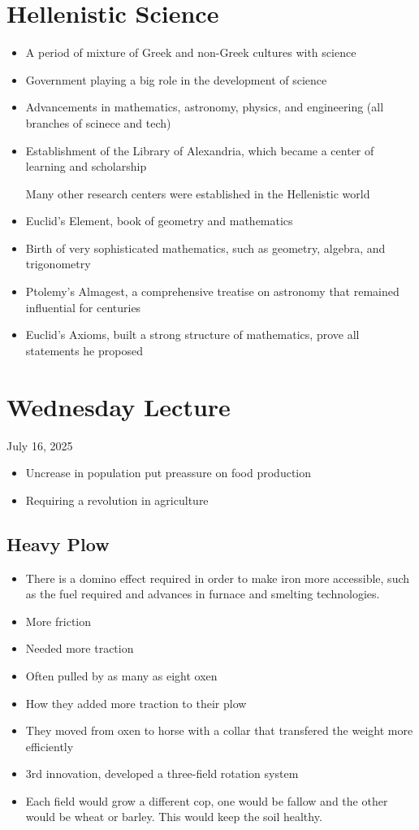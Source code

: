 \documentclass{article}
\begin{document}
\section*{Hellenistic Science}
\begin{itemize}
  \item A period of mixture of Greek and non-Greek cultures with science
  \item Government playing a big role in the development of science
  \item Advancements in mathematics, astronomy, physics, and engineering (all branches of scinece and tech)
  \item Establishment of the Library of Alexandria, which became a center of learning and scholarship

    Many other research centers were established in the Hellenistic world
  \item Euclid's Element, book of geometry and mathematics
  \item Birth of very sophisticated mathematics, such as geometry, algebra, and trigonometry
  \item Ptolemy's Almagest, a comprehensive treatise on astronomy that remained influential for centuries
  \item Euclid's Axioms, built a strong structure of mathematics,
    prove all statements he proposed
\end{itemize}


\section{Wednesday Lecture}
July 16, 2025

\begin{itemize}
  \item Uncrease in population put preassure on food production
  \item Requiring a revolution in agriculture
\end{itemize}

\subsection{Heavy Plow}
\begin{itemize}
  \item There is a domino effect required in order to make
    iron more accessible, such as the fuel required and advances in furnace and smelting
    technologies.
  \item More friction
  \item Needed more traction
  \item Often pulled by as many as eight oxen
  \item How they added more traction to their plow
  \item They moved from oxen to horse with a collar that transfered the weight more efficiently
  \item 3rd innovation, developed a three-field rotation system
  \item Each field would grow a different cop, one would be fallow and the other would be
    wheat or barley. This would keep the soil healthy.
\end{itemize}
\end{document}
